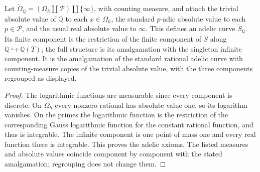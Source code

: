 \begin{definition}
\label{def:augmented-rational-adelic-curve}
\leanok
Let $\widetilde\Omega_{\mathbb Q}=(\Omega_h\amalg\mathcal P)\amalg\{\infty\}$,
with counting measure, and attach the trivial absolute value of $\mathbb Q$
to each $x\in\Omega_h$, the standard $p$-adic absolute value to each
$p\in\mathcal P$, and the usual real absolute value to $\infty$.
This defines an adelic curve $\widetilde S_{\mathbb Q}$.
Its finite component is the restriction of the finite component of $S$
along $\mathbb Q\hookrightarrow\mathbb Q(T)$; the full structure is its
amalgamation with the singleton infinite component.
It is the amalgamation of the standard rational adelic curve with
counting-measure copies of the trivial absolute value, with the three
components regrouped as displayed.
\end{definition}
\begin{proof}
The logarithmic functions are measurable since every component is discrete.
On $\Omega_h$ every nonzero rational has absolute value one, so its logarithm
vanishes. On the primes the logarithmic function is the restriction of the
corresponding Gauss logarithmic function for the constant rational function,
and thus is integrable. The infinite component is one point of mass one and
every real function there is integrable. This proves the adelic axioms.
The listed measures and absolute values coincide component by component
with the stated amalgamation; regrouping does not change them.
\end{proof}


